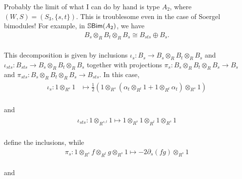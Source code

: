 \noindent Probably the limit of what I can do by hand is type $A_2$, where $(W, S) = (S_3, \{s, t\})$. This is troublesome even in the case of Soergel bimodules! For example, in $\mathbb{S}\textup{\textsf{Bim}}(A_2)$, we have\\[-\linespacing]
\begin{align*}
B_s \otimes_R B_t \otimes_R B_s \cong B_{sts} \oplus B_s.
\end{align*}
\noindent\\[-\linespacing] This decomposition is given by inclusions $\iota_s : B_s \to B_s \otimes_R B_t \otimes_R B_s$ and $\iota_{sts} : B_{sts} \to B_s \otimes_R B_t \otimes_R B_s$ together with projections $\pi_s : B_s \otimes_R B_t \otimes_R B_s \to B_s$ and $\pi_{sts} : B_s \otimes_R B_t \otimes_R B_s \to B_{sts}$. In this case,\\[-\linespacing]
\begin{align*}
\begin{split}
\iota_s : 1 \otimes_{R^s} 1 &\mapsto \frac{1}{2}(1 \otimes_{R^s} (\alpha_t \otimes_{R^t} 1 + 1 \otimes_{R^t} \alpha_t) \otimes_{R^s} 1)
\end{split}
\end{align*}
\noindent\\[-\linespacing] and\\[-\linespacing]
\begin{align*}
\begin{split}
\iota_{sts} : 1 \otimes_{R^{s,t}} 1 \mapsto 1 \otimes_{R^s} 1 \otimes_{R^t} 1 \otimes_{R^s} 1
\end{split}
\end{align*}
\noindent\\[-\linespacing] define the inclusions, while\\[-\linespacing]
\begin{align*}
\pi_s : 1 \otimes_{R^s} f \otimes_{R^t} g \otimes_{R^s} 1 \mapsto -2\partial_s(fg) \otimes_{R^s} 1
\end{align*}
\noindent\\[-\linespacing] and\\[-1.1\linespacing]
